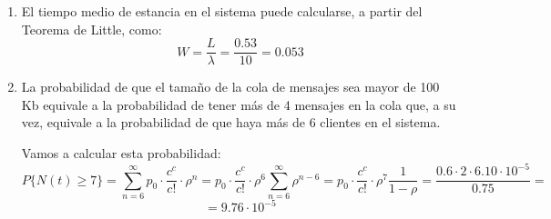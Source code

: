 \begin{problem}[11]
\begin{enumerate}
Pero sabemos que el tiempo de estancia en el sistema es la suma del tiempo de servicio más el tiempo de espera en cola, de modo que
\[L_q = λ W_q = λ (W-T_s)\]

y aplicando nuevamente el teorema de Little para calcula W tenemos:
\[L_q = λ\left(\frac{L}{λ}-\frac{1}{μ}\right)=L-cρ\]

Empezamos calculando el factor de utilización del sistema:
\[ρ = \frac{λ}{2μ}=\frac{λT_s}{2}=10\cdot 25ms = 0.25\]

Calculemos ahora el número medio de unidades en el sistema:
\[L=\frac{P_qρ}{1-ρ}+cρ\]
pero antes necesitamos conocer $P_q$:

\[P_q = \frac{p_c}{1-ρ}\]
y para ello necesitamos $p_c$ siendo $c=2$.

Para calcular $p_2$ tenemos que emplear la fórmula:
\[p_2=p_0\frac{c^c}{c!} \left(\frac{λ}{cμ}\right)^n\]

para lo que necesitamos conocer $p_0$.

\[p_0 = \left(1+0.5+\frac{0.5^2}{2\cdot 0.75}\footnote{Puesto que ρ < 1}\right)^{-1} = \frac{1}{1.64}=0.6\]

Una vez tenemos esto podemos calcular $p_2$.
\[p_2=p_0\frac{c^c}{c!} \left(\frac{λ}{cμ}\right)^n=0.6\cdot \frac{4}{2}\cdot (0.25)^2 = 0.075\]

Con este valor procedemos a calcular $P_q$:
\[P_q = \frac{p_c}{1-ρ} = \frac{0.075}{0.75}=0.1\]

Y ya estamos en condiciones de calcular $L$:
\[L=\frac{P_qρ}{1-ρ}+cρ = \frac{0.1\cdot 0.25}{0.75}+2\cdot 0.25 = 0.53\]

Ahora calculamos $L_q$
\[L_q = L -cρ = 0.53 - 2 \cdot 0.25 = 0.03\]

Y por último multiplicamos por el tamaño de cada mensaje:
\[\text{ Tamaño medio = } 0.03\cdot 25 Kb = 0.75KB\]
\item

El tiempo medio de estancia en el sistema puede calcularse, a partir del Teorema de Little, como:
\[W = \frac{L}{λ} = \frac{0.53}{10} = 0.053\]


\item La probabilidad de que el tamaño de la cola de mensajes sea mayor de 100 Kb equivale a la probabilidad de tener más de 4 mensajes en la cola que, a su vez, equivale a la probabilidad de que haya más de 6 clientes en el sistema.

Vamos a calcular esta probabilidad:
\[P\{N(t) \geq 7\} = \sum_{n=6}^{\infty} p_0\cdot \frac{c^c}{c!} \cdot ρ^n=p_0\cdot \frac{c^c}{c!} \cdot ρ^6 \sum_{n=6}^{\infty}ρ^{n-6} =p_0\cdot \frac{c^c}{c!} \cdot ρ^7 \frac{1}{1-ρ} = \frac{0.6\cdot 2 \cdot 6.10 \cdot 10^{-5} }{0.75}=\]
\[=9.76 \cdot 10^{-5}\]
\end{enumerate}

\end{problem}

